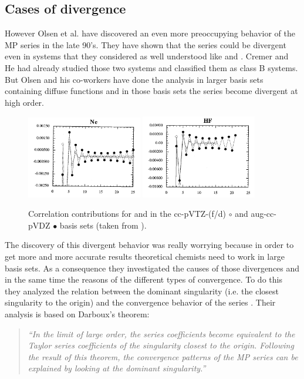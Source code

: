 \documentclass[11pt,a4paper]{article}
\begin{document}
\subsection{Cases of divergence}

However Olsen et al. have discovered an even more preoccupying behavior of the MP series in the late 90's. They have shown that the series could be divergent even in systems that they considered as well understood like  and  \cite{Olsen_1996, Christiansen_1996}. Cremer and He had already studied those two systems and classified them as class B systems. But Olsen and his co-workers have done the analysis in larger basis sets containing diffuse functions and in those basis sets the series become divergent at high order.

\begin{figure}[h!]
    \centering
    \includegraphics[width=0.45\textwidth]{Nedivergence.png}
    \includegraphics[width=0.45\textwidth]{HFdivergence.png}
    \caption{\centering Correlation contributions for  and  in the cc-pVTZ-(f/d) $\circ$ and aug-cc-pVDZ $\bullet$ basis sets (taken from \cite{Olsen_1996}).}
    \label{fig:my_label}
\end{figure}

The discovery of this divergent behavior was really worrying because in order to get more and more accurate results theoretical chemists need to work in large basis sets. As a consequence they investigated the causes of those divergences and in the same time the reasons of the different types of convergence. To do this they analyzed the relation between the dominant singularity (i.e. the closest singularity to the origin) and the convergence behavior of the series \cite{Olsen_2000}. Their analysis is based on Darboux's theorem: 
\begin{quote}
	\textit{``In the limit of large order, the series coefficients become equivalent to the Taylor series coefficients of the singularity closest to the origin. Following the result of this theorem, the convergence patterns of the MP series can be explained by looking at the dominant singularity.''}
\end{quote}
\end{document}
